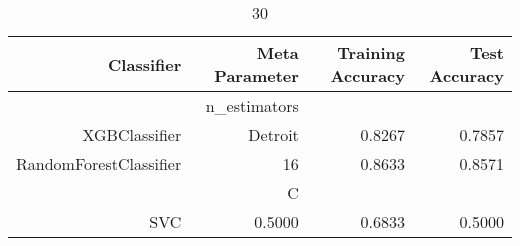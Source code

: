 
\begin{table}[H]
    \caption{30}
    \centering
    \begin{tabular}{|r|r|r|r|}
        \hline
        Classifier &Meta Parameter &Training Accuracy
        &Test Accuracy\\
        \hline
        &n\_estimators &\multicolumn{2}{|r|}{}\\
        \hline
        XGBClassifier &Detroit &0.8267 &0.7857\\
        \hline
        RandomForestClassifier &16 &0.8633 &0.8571\\
        \hline
        &C &\multicolumn{2}{|r|}{}\\
        \hline
        SVC &0.5000 &0.6833 &0.5000\\
        \hline
    \end{tabular}
\end{table}
